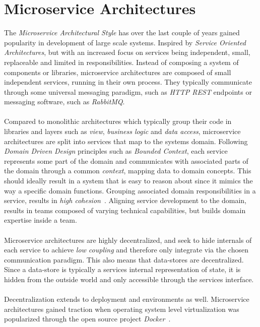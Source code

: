 \section{Microservice Architectures}
The \textit{Microservice Architectural Style} has over the last couple of years
gained popularity in development of large scale systems. Inspired by
\textit{Service Oriented Architectures}, but with an increased focus on
services being independent, small, replaceable and limited in responsibilities.
Instead of composing a system of components or libraries, microservice
architectures are composed of small independent services, running in their own
process. They typically communicate through some universal messaging paradigm,
such as \textit{HTTP REST} endpoints or messaging software, such as
\textit{RabbitMQ}.
\\\\
Compared to monolithic architectures which typically group their code in
libraries and layers such as \textit{view}, \textit{business logic} and
\textit{data access}, microservice architectures are split into services that
map to the systems domain. Following \textit{Domain Driven Design} principles
such as \textit{Bounded Context}, each service represents some part of the
domain and communicates with associated parts of the domain through a common
\textit{context}, mapping data to domain concepts. This should ideally result
in a system that is easy to reason about since it mimics the way a specific
domain functions. Grouping associated domain responsibilities in a service,
results in \textit{high cohesion}~\cite{fowlermicroservices}.
Aligning service development to the domain, results in teams composed of
varying technical capabilities, but builds domain expertise inside a team.
\\\\
Microservice architectures are highly decentralized, and seek to hide internals
of each service to achieve \textit{low coupling} and therefore only integrate
via the chosen communication paradigm. This also means that data-stores are
decentralized. Since a data-store is typically a services internal representation
of state, it is hidden from the outside world and only accessible through the
services interface.
\\\\
Decentralization extends to deployment and environments as well. Microservice
architectures gained traction when operating system level virtualization was
popularized through the open source project \textit{Docker}~\cite{docker}.
